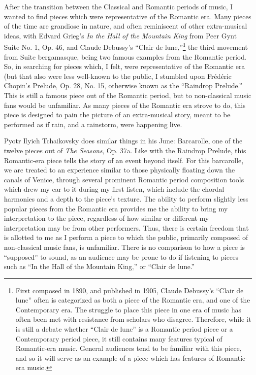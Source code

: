 After the transition between the Classical and Romantic periods of music, I wanted to find pieces which were representative of the Romantic era. Many pieces of the time are grandiose in nature, and often reminiscent of other extra-musical ideas, with Edvard Grieg's \textit{In the Hall of the Mountain King} from Peer Gynt Suite No. 1, Op. 46, and Claude Debussy's ``Clair de lune,''\footnote{First composed in 1890, and published in 1905, Claude Debussy's ``Clair de lune'' often is categorized as both a piece of the Romantic era, and one of the Contemporary era. The struggle to place this piece in one era of music has often been met with resistance from scholars who disagree. Therefore, while it is still a debate whether ``Clair de lune'' is a Romantic period piece or a Contemporary period piece, it still contains many features typical of Romantic-era music. General audiences tend to be familiar with this piece, and so it will serve as an example of a piece which has features of Romantic-era music.} the third movement from Suite bergamasque, being two famous examples from the Romantic period. So, in searching for pieces which, I felt, were representative of the Romantic era (but that also were less well-known to the public, I stumbled upon Frédéric Chopin's Prelude, Op. 28, No. 15, otherwise known as the ``Raindrop Prelude.'' This is still a famous piece out of the Romantic period, but to non-classical music fans would be unfamiliar. As many pieces of the Romantic era strove to do, this piece is designed to pain the picture of an extra-musical story, meant to be performed as if rain, and a rainstorm, were happening live. 

Pyotr Ilyich Tchaikovsky does similar things in his June: Barcarolle, one of the twelve pieces out of \textit{The Seasons}, Op. 37a. Like with the Raindrop Prelude, this Romantic-era piece tells the story of an event beyond itself. For this barcarolle, we are treated to an experience similar to those physically floating down the canals of Venice, through several prominent Romantic period composition tools which drew my ear to it during my first listen, which include the chordal harmonies and a depth to the piece's texture. The ability to perform slightly less popular pieces from the Romantic era provides me the ability to bring my interpretation to the piece, regardless of how similar or different my interpretation may be from other performers. Thus, there is certain freedom that is allotted to me as I perform a piece to which the public, primarily composed of non-classical music fans, is unfamiliar. There is no comparison to how a piece is ``supposed'' to sound, as an audience may be prone to do if listening to pieces such as ``In the Hall of the Mountain King,'' or ``Clair de lune.''

